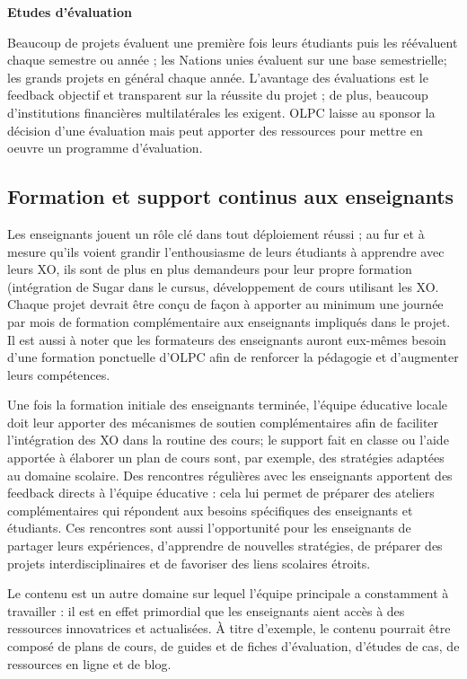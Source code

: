\documentclass[11pt]{article}
\begin{document}
\textbf{Etudes d'évaluation}


Beaucoup de projets évaluent une première fois leurs étudiants puis les
réévaluent chaque semestre ou année ; les Nations unies évaluent sur une
base semestrielle; les grands projets en général chaque année. L'avantage
des évaluations est le feedback objectif et transparent sur la réussite du
projet ; de plus, beaucoup d'institutions financières multilatérales les
exigent. OLPC laisse au sponsor la décision d'une évaluation mais peut
apporter des ressources pour mettre en oeuvre un programme d'évaluation.
\subsection{Formation et support continus aux enseignants}
\label{sec-10-1}



Les enseignants jouent un rôle clé dans tout déploiement réussi ; au fur et
à mesure qu'ils voient grandir l'enthousiasme de leurs étudiants à
apprendre avec leurs XO, ils sont de plus en plus demandeurs pour leur
propre formation (intégration de Sugar dans le cursus, développement de
cours utilisant les XO. Chaque projet devrait être conçu de façon à
apporter au minimum une journée par mois de formation complémentaire aux
enseignants impliqués dans le projet. Il est aussi à noter que les
formateurs des enseignants auront eux-mêmes besoin d'une formation
ponctuelle d'OLPC afin de renforcer la pédagogie et d'augmenter leurs
compétences.

Une fois la formation initiale des enseignants terminée, l'équipe éducative
locale doit leur apporter des mécanismes de soutien complémentaires afin de
faciliter l'intégration des XO dans la routine des cours; le support fait
en classe ou l'aide apportée à élaborer un plan de cours sont, par exemple,
des stratégies adaptées au domaine scolaire. Des rencontres régulières avec
les enseignants apportent des feedback directs à l'équipe éducative : cela
lui permet de préparer des ateliers complémentaires qui répondent aux
besoins spécifiques des enseignants et étudiants. Ces rencontres sont aussi
l'opportunité pour les enseignants de partager leurs expériences,
d'apprendre de nouvelles stratégies, de préparer des projets
interdisciplinaires et de favoriser des liens scolaires étroits.

Le contenu est un autre domaine sur lequel l'équipe principale a
constamment à travailler : il est en effet primordial que les enseignants
aient accès à des ressources innovatrices et actualisées. À titre
d'exemple, le contenu pourrait être composé de plans de cours, de guides et
de fiches  d'évaluation, d'études de cas, de ressources en ligne et de
blog.
\end{document}
